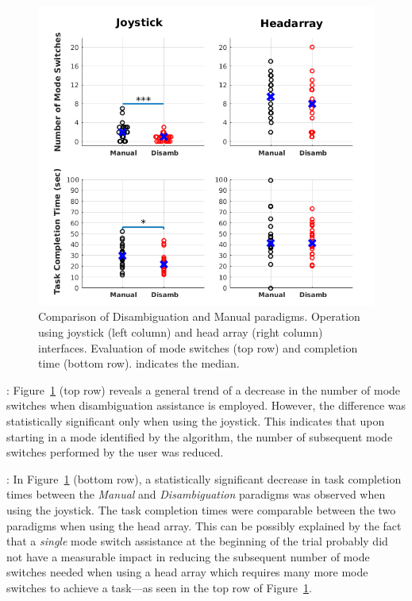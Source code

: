 \documentclass[conference]{IEEEtran}
\begin{document}
\begin{figure}[t]
	\centering
	\includegraphics[width = 1\hsize ,center]{./figures/FINAL_PLOT2.png}
	\vspace{-0.7cm}
	\caption{Comparison of Disambiguation and Manual paradigms. Operation using joystick (left column) and head array (right column) interfaces. Evaluation of mode switches (top row) and completion time (bottom row). {} indicates the median.}
	\label{DATAPLOT}
\end{figure}
\vspace{0.1cm}
: Figure~\ref{DATAPLOT} (top row) reveals a general trend of a decrease in the number of mode switches when disambiguation assistance is employed. However, the difference was statistically significant only when using the joystick. This indicates that upon starting in a mode identified by the algorithm, the number of subsequent mode switches performed by the user was reduced. 

\vspace{0.1cm}
: 
In Figure~\ref{DATAPLOT} (bottom row), a statistically significant decrease in task completion times between the \textit{Manual} and \textit{Disambiguation} paradigms was observed when using the joystick. The task completion times were comparable between the two paradigms when using the head array. This can be possibly explained by the fact that a \textit{single} mode switch assistance at the beginning of the trial probably did not have a measurable impact in reducing the subsequent number of mode switches needed when using a head array which requires many more mode switches to achieve a task---as seen in the top row of Figure~\ref{DATAPLOT}. 
\end{document}
